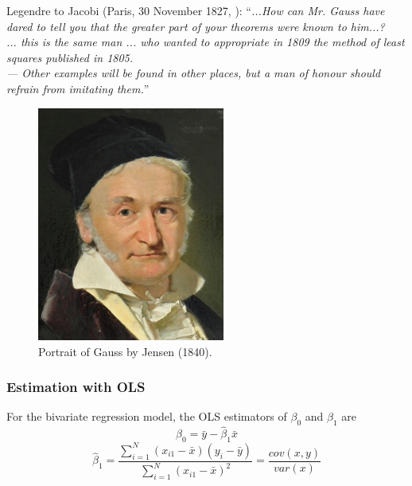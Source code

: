 \documentclass[a4paper,12pt]{article}
\begin{document}
\begin{multicols}{2}  %

    Legendre to Jacobi (Paris, 30 November 1827, \citealp{Plackett1972}): ``\textit{...How can Mr. Gauss have dared to tell you that the greater part of your theorems were known to him...?}\\[1ex] \textit{ ... this is the same man ... who wanted to appropriate in 1809 the method of least squares published in 1805.}\\[2ex] \textit{--- Other examples will be found in other places, but a man of honour should refrain from imitating them.}''

    \columnbreak  %

    \begin{figure}[H]
        \centering
        \includegraphics[width=0.55\textwidth]{figures/Gauss_klein}
        \caption{ Portrait of Gauss by Jensen (1840).}
    \end{figure}

\end{multicols}  %



\subsubsection*{Estimation with OLS}

For the bivariate regression model, the OLS estimators of $\beta_0$ and $\beta_1$ are \\

$$\hat{\beta}_0=\bar{y}-\hat{\beta}_1\bar{x}$$
$$\hat{\beta}_1=\frac{\sum^{N}_{i=1}{(x_{i1}-\bar{x})(y_{i}-\bar{y})}}{\sum^{N}_{i=1}{(x_{i1}-\bar{x})^2}}=\frac{cov(x,y)}{var(x)}$$
\end{document}

